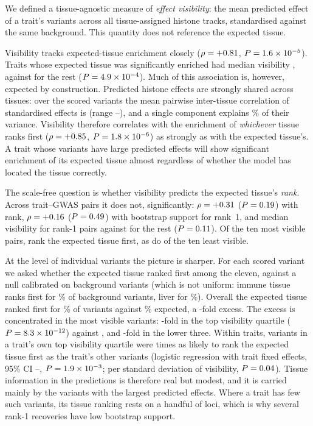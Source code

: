 \documentclass[11pt]{article}
\begin{document}
We defined a tissue-agnostic measure of \emph{effect visibility}: the mean predicted
effect of a trait's variants across all tissue-assigned histone tracks, standardised
against the same background. This quantity does not reference the expected tissue.

Visibility tracks expected-tissue enrichment closely ($\rho = +0.81$, $P = 1.6\times 10^{-5}$).
Traits whose expected tissue was significantly enriched had median visibility \VISREC{},
against \VISNOT{} for the rest ($P = 4.9\times 10^{-4}$). Much of this association is, however,
expected by construction. Predicted histone effects are strongly shared across tissues:
over the \NVAR{} scored variants the mean pairwise inter-tissue correlation of
standardised effects is \INTERTISSUE{} (range \INTERTISSUEMIN{}--\INTERTISSUEMAX{}), and
a single component explains \PCONE{}\% of their variance. Visibility therefore correlates
with the enrichment of \emph{whichever} tissue ranks first ($\rho = +0.85$,
$P = 1.8\times 10^{-6}$) as strongly as with the expected tissue's. A trait whose variants have
large predicted effects will show significant enrichment of its expected tissue almost
regardless of whether the model has located the tissue correctly.

The scale-free question is whether visibility predicts the expected tissue's
\emph{rank}. Across trait--GWAS pairs it does not, significantly: $\rho = +0.31$
($P = 0.19$) with rank, $\rho = +0.16$ ($P = 0.49$) with bootstrap
support for rank~1, and median visibility \VISRANKONE{} for rank-1 pairs against
\VISRANKNOT{} for the rest ($P = 0.11$). Of the ten most visible pairs, \NTOPVISHIT{} rank the expected tissue first, as do
\NBOTVISHIT{} of the ten least visible.

At the level of individual variants the picture is sharper. For each scored variant we
asked whether the expected tissue ranked first among the eleven, against a null
calibrated on background variants (which is not uniform: immune tissue ranks first for
\IMMUNENULL{}\% of background variants, liver for \LIVERNULL{}\%). Overall the expected
tissue ranked first for \ALLOBS{}\% of variants against \ALLNULL{}\% expected, a
\ALLRATIO{}-fold excess. The excess is concentrated in the most visible variants:
\QHIGHRATIO{}-fold in the top visibility quartile ($P = 8.3\times 10^{-12}$) against \QLOWRATIO{},
\QTWORATIO{} and \QTHREERATIO{}-fold in the lower three. Within traits, variants in a
trait's own top visibility quartile were \ORTOPQ{} times as likely to rank the expected
tissue first as the trait's other variants (logistic regression with trait fixed effects,
95\% CI \ORTOPQLO{}--\ORTOPQHI{}, $P = 1.9\times 10^{-3}$; \ORVISSD{} per standard deviation of
visibility, $P = 0.04$). Tissue information in the predictions is therefore real but
modest, and it is carried mainly by the variants with the largest predicted effects.
Where a trait has few such variants, its tissue ranking rests on a handful of loci, which
is why several rank-1 recoveries have low bootstrap support.
\end{document}
